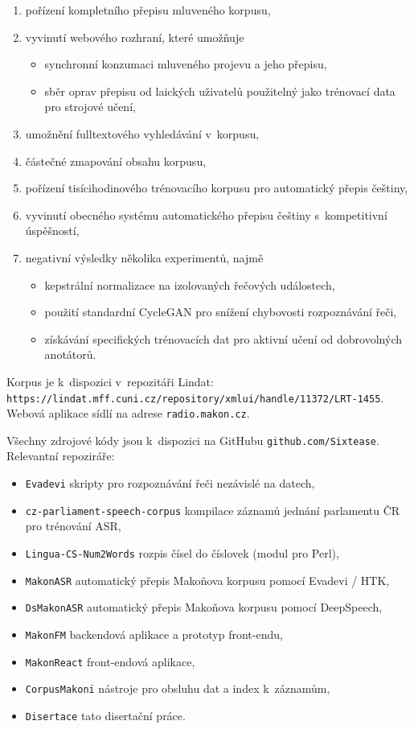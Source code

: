 \begin{enumerate}
\item{pořízení kompletního přepisu mluveného korpusu,}
\item{vyvinutí webového rozhraní, které umožňuje
    \begin{itemize}
    \item{synchronní konzumaci mluveného projevu a jeho přepisu,}
    \item{
        sběr oprav přepisu od laických uživatelů použitelný jako trénovací data
        pro strojové učení,
    }
    \end{itemize}
}
\item{umožnění fulltextového vyhledávání v~korpusu,}
\item{částečné zmapování obsahu korpusu,}
\item{
    pořízení tisícihodinového trénovacího korpusu pro automatický přepis
    češtiny,
}
\item{
    vyvinutí obecného systému automatického přepisu češtiny s~kompetitivní
    úspěšností,
}
\item{
    negativní výsledky několika experimentů, najmě
    \begin{itemize}
    \item{kepstrální normalizace na izolovaných řečových událostech,}
    \item{použití standardní CycleGAN pro snížení chybovosti rozpoznávání řeči,}
    \item{
        získávání specifických trénovacích dat pro aktivní učení od
        dobrovolných anotátorů.
    }
    \end{itemize}
}
\end{enumerate}

Korpus je k~dispozici v~repozitáři Lindat:\\
\texttt{https://lindat.mff.cuni.cz/repository/xmlui/handle/11372/LRT-1455}.\\
Webová aplikace sídlí na adrese \texttt{radio.makon.cz}.

Všechny zdrojové kódy jsou k~dispozici na GitHubu \texttt{github.com/Sixtease}.
Relevantní repoziráře:
\begin{itemize}
\item{\texttt{Evadevi} skripty pro rozpoznávání řeči nezávislé na datech,}
\item{\texttt{cz-parliament-speech-corpus}
    kompilace záznamů jednání parlamentu ČR pro trénování ASR,
}
\item{\texttt{Lingua-CS-Num2Words} rozpis čísel do číslovek (modul pro Perl),}
\item{\texttt{MakonASR} automatický přepis Makoňova korpusu pomocí Evadevi / HTK,}
\item{\texttt{DsMakonASR} automatický přepis Makoňova korpusu pomocí DeepSpeech,}
\item{\texttt{MakonFM} backendová aplikace a prototyp front-endu,}
\item{\texttt{MakonReact} front-endová aplikace,}
\item{\texttt{CorpusMakoni} nástroje pro obsluhu dat a index k~záznamům,}
\item{\texttt{Disertace} tato disertační práce.}
\end{itemize}

